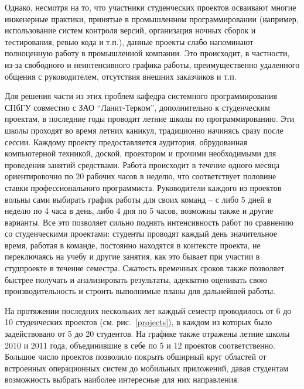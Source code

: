 \documentclass[a5paper]{article}
\begin{document}
Однако, несмотря на то, что участники студенческих проектов осваивают многие инженерные практики, принятые в промышленном программировании (например, использование систем контроля версий, организация ночных сборок и тестирования, ревью кода и т.п.), данные проекты слабо напоминают полноценную работу в промышленной компании. Это происходит, в частности, из-за свободного и неинтенсивного графика работы, преимущественно удаленного общения с руководителем, отсутствия внешних заказчиков и т.п.

Для решения части из этих проблем кафедра системного программирования СПбГУ совместно с ЗАО ``Ланит-Терком'', дополнительно к студенческим проектам,  в последние годы проводит летние школы по программированию. Эти школы проходят во время летних каникул, традиционно начинясь сразу после сессии. Каждому проекту предоставляется аудитория, обрудованная компьютерной техникой, доской, проектором и прочими необходимыми для проведения занятий средствами. Работа происходит в течение одного месяца ориентировочно по 20 рабочих часов в неделю, что соответствует половине ставки профессионального программиста. Руководители каждого из проектов вольны сами выбирать график работы для своих команд – с либо 5 дней в неделю по 4 часа в день, либо 4 дня по 5 часов, возможны также и другие варианты. Все это позволяет сильно поднять интенсивность работ по сравнению со студенческими проектами: студенты проводят каждый день значительное время, работая в команде, постоянно находятся в контексте проекта, не переключаясь на учебу и другие занятия, как это бывает при участии в студпроекте в течение семестра. Сжатость временных сроков также позволяет быстрее получать и анализировать результаты, адекватно оценивать свою производительность и строить выполнимые планы для дальнейшей работы. 

На протяжении последних нескольких лет каждый семестр проводилось от 6 до 10 студенческих проектов (см. рис.~\ref{projects}), в каждом из которых было задействовано от 5 до 20 студентов. На графике также отражены летние школы 2010 и 2011 года, объединившие в себе по 5 и 12 проектов соответственно. Большое число проектов позволило покрыть обширный круг областей от встроенных операционных систем до мобильных приложений, давая студентам возможность выбрать наиболее интересные для них направления.
\end{document}
